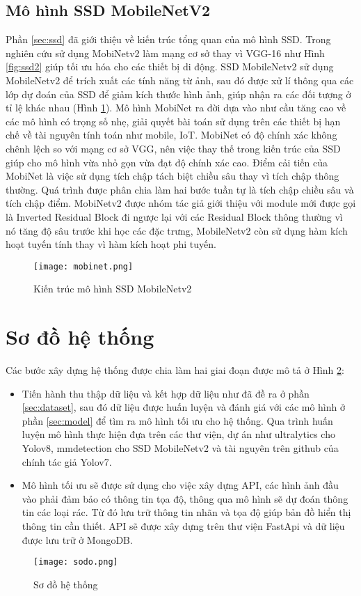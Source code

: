 \documentclass[../the.tex]{subfiles}
\begin{document}
\subsection{Mô hình SSD MobileNetV2}
{\fontsize{13}{12} \selectfont 
Phần \ref{sec:ssd} đã giới thiệu về kiến trúc tổng quan của mô hình SSD. Trong nghiên cứu sử dụng MobiNetv2 \cite{sandler2019mobilenetv2} làm mạng cơ sở thay vì VGG-16 như Hình \ref{fig:ssd2} giúp tối ưu hóa cho các thiết bị di động. SSD MobileNetv2 sử dụng MobileNetv2 để trích xuất các tính năng từ ảnh, sau đó được xử lí thông qua các lớp dự đoán của SSD để giảm kích thước hình ảnh, giúp nhận ra các đối tượng ở tỉ lệ khác nhau (Hình \ref{fig:mobinet}).
Mô hình MobiNet ra đời dựa vào như cầu tăng cao về các mô hình có trọng số nhẹ, giải quyết bài toán sử dụng trên các thiết bị hạn chế về tài nguyên tính toán như mobile, IoT. MobiNet có độ chính xác không chênh lệch so với mạng cơ sở VGG, nên việc thay thế trong kiến trúc của SSD giúp cho mô hình vừa nhỏ gọn vừa đạt độ chính xác cao.
Điểm cải tiến của MobiNet là việc sử dụng tích chập tách biệt chiều sâu thay vì tích chập thông thường. Quá trình được phân chia làm hai bước tuần tự là tích chập chiều sâu và tích chập điểm.
MobiNetv2 được nhóm tác giả giới thiệu với module mới được gọi là Inverted Residual Block đi ngược lại với các Residual Block thông thường vì nó tăng độ sâu trước khi học các đặc trưng, MobileNetv2 còn sử dụng hàm kích hoạt tuyến tính thay vì hàm kích hoạt phi tuyến.
}

\begin{figure}[H]
	\centering
	\texttt{[image: mobinet.png]}
	\caption{Kiến trúc mô hình SSD MobileNetv2}
	\label{fig:mobinet}
\end{figure}

\section{Sơ đồ hệ thống}

{\fontsize{13}{12} \selectfont 
Các bước xây dựng hệ thống được chia làm hai giai đoạn được mô tả ở Hình \ref{fig:sodo}:
\begin{itemize}
	\item Tiến hành thu thập dữ liệu và kết hợp dữ liệu như đã đề ra ở phần \ref{sec:dataset}, sau đó dữ liệu được huấn luyện và đánh giá với các mô hình ở phần \ref{sec:model} để tìm ra mô hình tối ưu cho hệ thống.
	Qua trình huấn luyện mô hình thực hiện đựa trên các thư viện, dự án như ultralytics cho Yolov8, mmdetection cho SSD MobileNetv2 và tài nguyên trên github của chính tác giả Yolov7.
	\item Mô hình tối ưu sẽ được sử dụng cho việc xây dựng API, các hình ảnh đầu vào phải đảm bảo có thông tin tọa độ, thông qua mô hình sẽ dự đoán thông tin các loại rác. Từ đó lưu trữ thông tin nhãn và tọa độ giúp bản đồ hiển thị thông tin cần thiết. 
	API sẽ được xây dựng trên thư viện FastApi và dữ liệu được lưu trữ ở MongoDB.
\end{itemize}
}

\begin{figure}[H]
	\centering
	\texttt{[image: sodo.png]}
	\caption{Sơ đồ hệ thống}
	\label{fig:sodo}
\end{figure}
\end{document}
